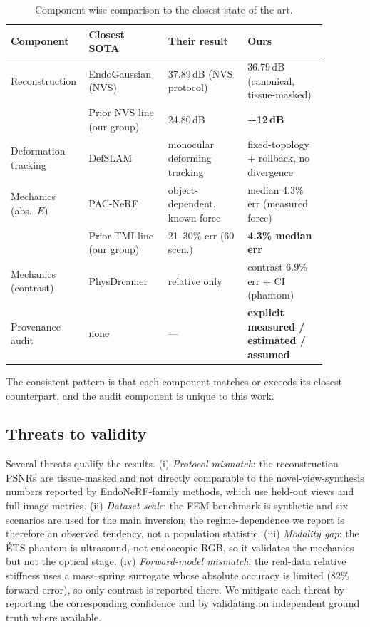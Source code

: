 \documentclass[review]{elsarticle}
\begin{document}
\begin{table}[htbp]
\centering
\caption{Component-wise comparison to the closest state of the art.}
\label{tab:componentwise}
\small
\begin{tabular}{@{}p{0.16\linewidth}p{0.24\linewidth}p{0.24\linewidth}p{0.24\linewidth}@{}}
\toprule
Component & Closest SOTA & Their result & Ours \\
\midrule
Reconstruction & EndoGaussian \citep{endogaussian} (NVS) & 37.89\,dB (NVS protocol) & 36.79\,dB (canonical, tissue-masked) \\
 & Prior NVS line (our group) & 24.80\,dB & \textbf{+12\,dB} \\
Deformation tracking & DefSLAM \citep{defslam} & monocular deforming tracking & fixed-topology + rollback, no divergence \\
Mechanics (abs.\ $E$) & PAC-NeRF \citep{pacnerf} & object-dependent, known force & median 4.3\% err (measured force) \\
 & Prior TMI-line (our group) & 21--30\% err (60 scen.) & \textbf{4.3\% median err} \\
Mechanics (contrast) & PhysDreamer \citep{physdreamer} & relative only & contrast 6.9\% err + CI (phantom) \\
Provenance audit & none & --- & \textbf{explicit measured / estimated / assumed} \\
\bottomrule
\end{tabular}
\end{table}

The consistent pattern is that each component matches or exceeds its
closest counterpart, and the audit component is unique to this work.

\subsection{Threats to validity}
\label{sec:threats}
Several threats qualify the results. (i) \emph{Protocol mismatch}: the
reconstruction PSNRs are tissue-masked and not directly comparable to the
novel-view-synthesis numbers reported by EndoNeRF-family methods, which use
held-out views and full-image metrics. (ii) \emph{Dataset scale}: the FEM
benchmark is synthetic and six scenarios are used for the main inversion;
the regime-dependence we report is therefore an observed tendency, not a
population statistic. (iii) \emph{Modality gap}: the \'ETS phantom is
ultrasound, not endoscopic RGB, so it validates the mechanics but not the
optical stage. (iv) \emph{Forward-model mismatch}: the real-data relative
stiffness uses a mass--spring surrogate whose absolute accuracy is limited
(82\% forward error), so only contrast is reported there. We mitigate each
threat by reporting the corresponding confidence and by validating on
independent ground truth where available.
\end{document}
